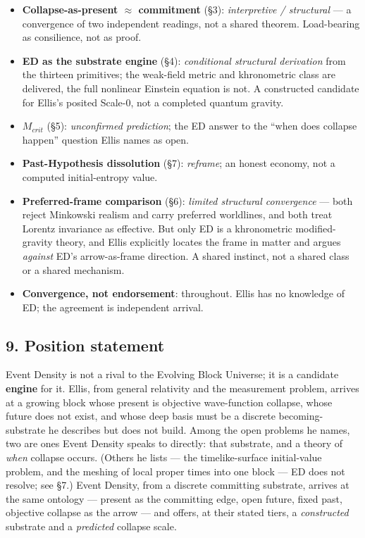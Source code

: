 \documentclass[
  11pt,
]{article}
\providecommand{\tightlist}{%
  \setlength{\itemsep}{0pt}\setlength{\parskip}{0pt}}
\providecommand{\tightlist}{}
\begin{document}
\begin{itemize}
\tightlist
\item
  \textbf{Collapse-as-present \(\approx\) commitment} (§3):
  \emph{interpretive / structural} --- a convergence of two independent
  readings, not a shared theorem. Load-bearing as consilience, not as
  proof.
\item
  \textbf{ED as the substrate engine} (§4): \emph{conditional structural
  derivation} from the thirteen primitives; the weak-field metric and
  khronometric class are delivered, the full nonlinear Einstein equation
  is not. A constructed candidate for Ellis's posited Scale-0, not a
  completed quantum gravity.
\item
  \textbf{\(M_{crit}\)} (§5): \emph{unconfirmed prediction}; the ED
  answer to the ``when does collapse happen'' question Ellis names as
  open.
\item
  \textbf{Past-Hypothesis dissolution} (§7): \emph{reframe}; an honest
  economy, not a computed initial-entropy value.
\item
  \textbf{Preferred-frame comparison} (§6): \emph{limited structural
  convergence} --- both reject Minkowski realism and carry preferred
  worldlines, and both treat Lorentz invariance as effective. But only
  ED is a khronometric modified-gravity theory, and Ellis explicitly
  locates the frame in matter and argues \emph{against} ED's
  arrow-as-frame direction. A shared instinct, not a shared class or a
  shared mechanism.
\item
  \textbf{Convergence, not endorsement}: throughout. Ellis has no
  knowledge of ED; the agreement is independent arrival.
\end{itemize}

\subsection{9. Position statement}\label{position-statement}

Event Density is not a rival to the Evolving Block Universe; it is a
candidate \textbf{engine} for it. Ellis, from general relativity and the
measurement problem, arrives at a growing block whose present is
objective wave-function collapse, whose future does not exist, and whose
deep basis must be a discrete becoming-substrate he describes but does
not build. Among the open problems he names, two are ones Event Density
speaks to directly: that substrate, and a theory of \emph{when} collapse
occurs. (Others he lists --- the timelike-surface initial-value problem,
and the meshing of local proper times into one block --- ED does not
resolve; see §7.) Event Density, from a discrete committing substrate,
arrives at the same ontology --- present as the committing edge, open
future, fixed past, objective collapse as the arrow --- and offers, at
their stated tiers, a \emph{constructed} substrate and a
\emph{predicted} collapse scale.
\end{document}
